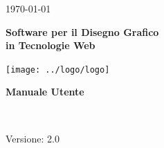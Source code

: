 \usepackage{multirow}
\title{\TITOLODOC}
\author{Marco Cunico}
 


\renewcommand{\insertversion}{2.0} %
\renewcommand{\TITOLODOC}{Manuale Utente} %
\renewcommand{\glosspath}{.\glossario} %
 
\begin{titlepage}
\begin{center}
  \begin{Large}  \today \end{Large}
\end{center}
 
\vspace{20pt}
 
\begin{center}
  \begin{Huge}
        \textbf{\ajax}
  \end{Huge}
\end{center}      
 
\begin{center}
  \begin{large}
        \textbf{Software per il Disegno Grafico\\ in Tecnologie Web}
  \end{large}
\end{center}      
 
\vspace{20pt}
 
\begin{center}
\texttt{[image: ../logo/logo]}
\end{center}
 
\vspace{170pt}
\begin{center} %
  \begin{Huge}
        \textbf{\TITOLODOC}
  \end{Huge}
      \\
\end{center}
\vspace{190pt}
\begin{center}
Versione: \insertversion
\end{center}
\end{titlepage}
 

